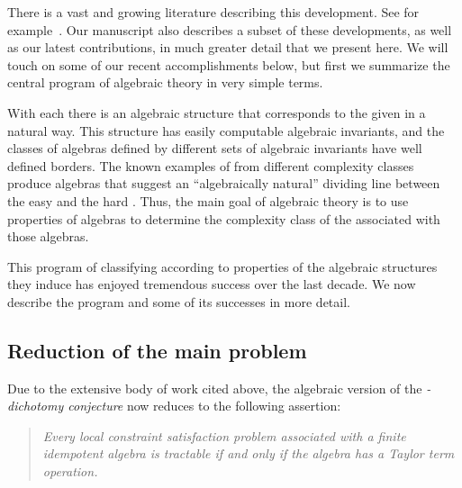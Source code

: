There is a vast and growing literature describing this development.
See for example~\cite{%
  MR2953899,
  MR2893395,
  MR3374664,
  MR3350338,
  MR2563736,
  MR2137072,
  MR2926316}.
Our manuscript \cite{Bergman-DeMeo:2016} also describes a subset of
these developments, as well as our latest contributions, in much greater detail
that we present here. We will touch on some of our recent accomplishments
below, but first we summarize the central
program of algebraic \csp  theory in very simple terms.

With each \csp there is an algebraic structure that corresponds to the given \csp
in a natural way. This structure has easily computable algebraic invariants, 
and the classes of algebras defined by different sets of algebraic invariants
have well defined borders. 
The known examples of \csps from different complexity classes
produce algebras that suggest an ``algebraically natural'' dividing line between
the easy and the hard \csps.
Thus, the main goal of algebraic \csp theory is to use properties
of algebras to determine the complexity class of the \csps associated with those
algebras.

This program of classifying \csps according to properties of the algebraic
structures they induce has enjoyed tremendous success over the last
decade. We now describe the program and some of its successes in more detail.


\subsection{Reduction of the main problem}
Due to the extensive body of work cited above, the algebraic version of the
{\it \csp-dichotomy conjecture} now reduces to the following
assertion:
\begin{quote}
\emph{Every local constraint satisfaction problem associated with a finite
idempotent algebra is tractable if and only if the algebra has a Taylor term operation.}
\end{quote}

